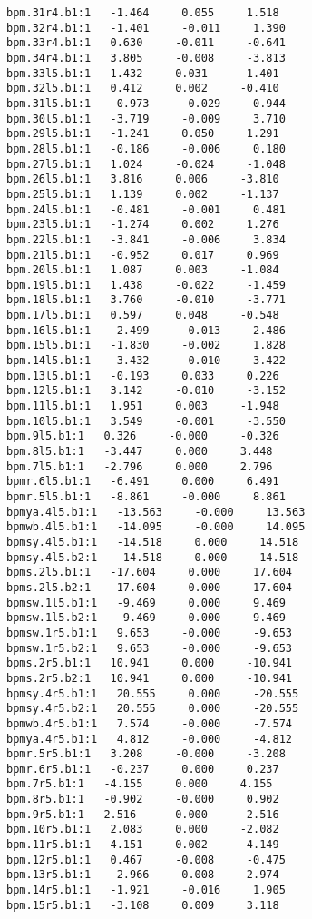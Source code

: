 \begin{verbatim}
bpm.31r4.b1:1   -1.464     0.055     1.518
bpm.32r4.b1:1   -1.401     -0.011     1.390
bpm.33r4.b1:1   0.630     -0.011     -0.641
bpm.34r4.b1:1   3.805     -0.008     -3.813
bpm.33l5.b1:1   1.432     0.031     -1.401
bpm.32l5.b1:1   0.412     0.002     -0.410
bpm.31l5.b1:1   -0.973     -0.029     0.944
bpm.30l5.b1:1   -3.719     -0.009     3.710
bpm.29l5.b1:1   -1.241     0.050     1.291
bpm.28l5.b1:1   -0.186     -0.006     0.180
bpm.27l5.b1:1   1.024     -0.024     -1.048
bpm.26l5.b1:1   3.816     0.006     -3.810
bpm.25l5.b1:1   1.139     0.002     -1.137
bpm.24l5.b1:1   -0.481     -0.001     0.481
bpm.23l5.b1:1   -1.274     0.002     1.276
bpm.22l5.b1:1   -3.841     -0.006     3.834
bpm.21l5.b1:1   -0.952     0.017     0.969
bpm.20l5.b1:1   1.087     0.003     -1.084
bpm.19l5.b1:1   1.438     -0.022     -1.459
bpm.18l5.b1:1   3.760     -0.010     -3.771
bpm.17l5.b1:1   0.597     0.048     -0.548
bpm.16l5.b1:1   -2.499     -0.013     2.486
bpm.15l5.b1:1   -1.830     -0.002     1.828
bpm.14l5.b1:1   -3.432     -0.010     3.422
bpm.13l5.b1:1   -0.193     0.033     0.226
bpm.12l5.b1:1   3.142     -0.010     -3.152
bpm.11l5.b1:1   1.951     0.003     -1.948
bpm.10l5.b1:1   3.549     -0.001     -3.550
bpm.9l5.b1:1   0.326     -0.000     -0.326
bpm.8l5.b1:1   -3.447     0.000     3.448
bpm.7l5.b1:1   -2.796     0.000     2.796
bpmr.6l5.b1:1   -6.491     0.000     6.491
bpmr.5l5.b1:1   -8.861     -0.000     8.861
bpmya.4l5.b1:1   -13.563     -0.000     13.563
bpmwb.4l5.b1:1   -14.095     -0.000     14.095
bpmsy.4l5.b1:1   -14.518     0.000     14.518
bpmsy.4l5.b2:1   -14.518     0.000     14.518
bpms.2l5.b1:1   -17.604     0.000     17.604
bpms.2l5.b2:1   -17.604     0.000     17.604
bpmsw.1l5.b1:1   -9.469     0.000     9.469
bpmsw.1l5.b2:1   -9.469     0.000     9.469
bpmsw.1r5.b1:1   9.653     -0.000     -9.653
bpmsw.1r5.b2:1   9.653     -0.000     -9.653
bpms.2r5.b1:1   10.941     0.000     -10.941
bpms.2r5.b2:1   10.941     0.000     -10.941
bpmsy.4r5.b1:1   20.555     0.000     -20.555
bpmsy.4r5.b2:1   20.555     0.000     -20.555
bpmwb.4r5.b1:1   7.574     -0.000     -7.574
bpmya.4r5.b1:1   4.812     -0.000     -4.812
bpmr.5r5.b1:1   3.208     -0.000     -3.208
bpmr.6r5.b1:1   -0.237     0.000     0.237
bpm.7r5.b1:1   -4.155     0.000     4.155
bpm.8r5.b1:1   -0.902     -0.000     0.902
bpm.9r5.b1:1   2.516     -0.000     -2.516
bpm.10r5.b1:1   2.083     0.000     -2.082
bpm.11r5.b1:1   4.151     0.002     -4.149
bpm.12r5.b1:1   0.467     -0.008     -0.475
bpm.13r5.b1:1   -2.966     0.008     2.974
bpm.14r5.b1:1   -1.921     -0.016     1.905
bpm.15r5.b1:1   -3.108     0.009     3.118

\end{verbatim}
